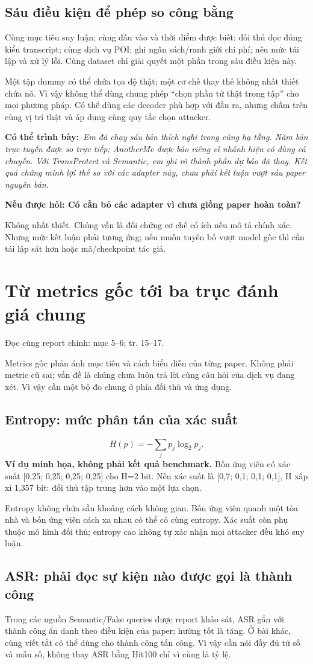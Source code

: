 \documentclass[10pt,a4paper]{article}
\newcommand{\say}[1]{\par\textbf{Có thể trình bày:}\ \textit{#1}\par}
\newcommand{\ask}[2]{\par\textbf{Nếu được hỏi: #1}\par #2\par}
\newcommand{\where}[1]{\par{\small\color{gray}Đọc cùng report chính: #1.}\par}
\newcommand{\example}{\textbf{Ví dụ minh họa, không phải kết quả benchmark.} }
\newcommand{\guidepage}[1]{\clearpage\section{#1}}
\begin{document}
\subsection*{Sáu điều kiện để phép so công bằng}
Cùng mục tiêu suy luận; cùng đầu vào và thời điểm được biết; đối thủ đọc đúng kiểu transcript; cùng dịch vụ POI; ghi ngân sách/ranh giới chi phí; nêu mức tái lập và xử lý lỗi. Cùng dataset chỉ giải quyết một phần trong sáu điều kiện này.

Một tập dummy có thể chứa tọa độ thật; một cơ chế thay thế không nhất thiết chứa nó. Vì vậy không thể dùng chung phép ``chọn phần tử thật trong tập'' cho mọi phương pháp. Có thể dùng các decoder phù hợp với đầu ra, nhưng chấm trên cùng vị trí thật và áp dụng cùng quy tắc chọn attacker.

\say{Em đã chạy sáu bản thích nghi trong cùng hạ tầng. Năm bản trực tuyến được so trực tiếp; AnotherMe được báo riêng vì nhánh hiện có dùng cả chuyến. Với TransProtect và Semantic, em ghi rõ thành phần dự báo đã thay. Kết quả chứng minh lợi thế so với các adapter này, chưa phải kết luận vượt sáu paper nguyên bản.}
\ask{Có cần bỏ các adapter vì chưa giống paper hoàn toàn?}{Không nhất thiết. Chúng vẫn là đối chứng cơ chế có ích nếu mô tả chính xác. Nhưng mức kết luận phải tương ứng; nếu muốn tuyên bố vượt model gốc thì cần tái lập sát hơn hoặc mã/checkpoint tác giả.}

\guidepage{Từ metrics gốc tới ba trục đánh giá chung}
\where{mục 5--6; tr. 15--17}
Metrics gốc phản ánh mục tiêu và cách biểu diễn của từng paper. Không phải metric cũ sai; vấn đề là chúng chưa luôn trả lời cùng câu hỏi của dịch vụ đang xét. Vì vậy cần một bộ đo chung ở phía đối thủ và ứng dụng.

\subsection*{Entropy: mức phân tán của xác suất}
\[
H(p)=-\sum_j p_j\log_2 p_j.
\]
\example Bốn ứng viên có xác suất [0,25; 0,25; 0,25; 0,25] cho H=2 bit. Nếu xác suất là [0,7; 0,1; 0,1; 0,1], H xấp xỉ 1,357 bit: đối thủ tập trung hơn vào một lựa chọn.

Entropy không chứa sẵn khoảng cách không gian. Bốn ứng viên quanh một tòa nhà và bốn ứng viên cách xa nhau có thể có cùng entropy. Xác suất còn phụ thuộc mô hình đối thủ; entropy cao không tự xác nhận mọi attacker đều khó suy luận.

\subsection*{ASR: phải đọc sự kiện nào được gọi là thành công}
Trong các nguồn Semantic/Fake queries được report khảo sát, ASR gắn với thành công ẩn danh theo điều kiện của paper; hướng tốt là tăng. Ở bài khác, cùng viết tắt có thể dùng cho thành công tấn công. Vì vậy cần nói đầy đủ tử số và mẫu số, không thay ASR bằng Hit100 chỉ vì cùng là tỷ lệ.
\end{document}
